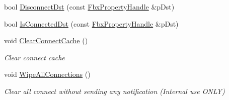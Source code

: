 \begin{Indent}
\begin{DoxyCompactItemize}
\item 
bool \hyperlink{class_fbx_property_handle_a896af2c51a9e9b1c9cc45c20b0c17801}{Disconnect\+Dst} (const \hyperlink{class_fbx_property_handle}{Fbx\+Property\+Handle} \&p\+Dst)
\item 
bool \hyperlink{class_fbx_property_handle_adf42d55aa7e6ce3f4389c73fe45f4adc}{Is\+Connected\+Dst} (const \hyperlink{class_fbx_property_handle}{Fbx\+Property\+Handle} \&p\+Dst)
\item 
void \hyperlink{class_fbx_property_handle_a7c7d33409675381ba019ac3a2d67c372}{Clear\+Connect\+Cache} ()
\begin{DoxyCompactList}\small\item\em Clear connect cache \end{DoxyCompactList}\item 
void \hyperlink{class_fbx_property_handle_abac85431f7a869fe1cf8a8cb1e8097ec}{Wipe\+All\+Connections} ()
\begin{DoxyCompactList}\small\item\em Clear all connect without sending any notification (Internal use O\+N\+LY) \end{DoxyCompactList}\end{DoxyCompactItemize}
\end{Indent}
